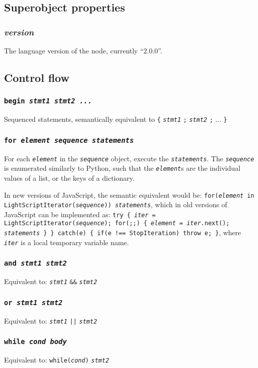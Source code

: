 \documentclass[10pt]{article}
\newcommand{\ch}[1]{{\tt\em #1}}
\begin{document}
\subsection{Superobject properties}
\subsubsection{\em version}
The language version of the node, currently ``2.0.0''.

\subsection{Control flow}
\subsubsection{\tt begin \em stmt1 stmt2 ...}
Sequenced statements, semantically equivalent to \verb|{| \ch{stmt1} \verb|;| \ch{stmt2} \verb|;| ... \verb|}|
\subsubsection{\tt for \em element sequence statements}

For each \ch{element} in the \ch{sequence} object, execute the \ch{statements}.
The \ch{sequence} is enumerated similarly to Python, such that the \ch{element}s are the individual values of a list, or the keys of a dictionary. 

In new versions of JavaScript, the semantic equivalent would be: {\tt for(\ch{element} in LightScriptIterator(\ch{sequence})) \ch{statements}},
which in old versions of JavaScript can be implemented as: 
{\tt try \verb|{| {\em iter} = LightScriptIterator({\em sequence}); for(;;) \verb|{| 
    {\em element} = {\em iter}.next();
    {\em statements}
\verb|}| \verb|}| catch(e) \verb|{| if(e !== StopIteration) throw e; \verb|}|}, where \ch{iter} is a local temporary variable name.

\subsubsection{\tt and \em stmt1 stmt2}
Equivalent to: \ch{stmt1} \verb|&&| \ch{stmt2}
\subsubsection{\tt or \em stmt1 stmt2}
Equivalent to: \ch{stmt1} \verb]||] \ch{stmt2}
\subsubsection{\tt while \em cond body}
Equivalent to: \verb|while(|\ch{cond}\verb|)| \ch{stmt2}
\end{document}
